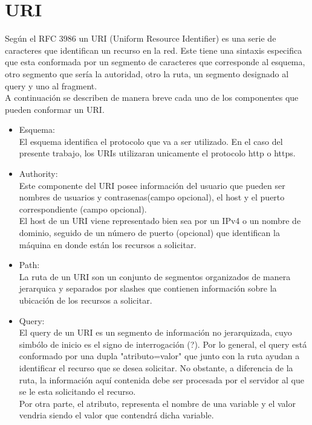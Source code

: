 \documentclass{article}
\begin{document}
\section{URI}

Seg\'un el RFC 3986 un URI (Uniform Resource Identifier) es una serie de caracteres que identifican un recurso en la red. Este tiene una sintaxis especifica que esta conformada por un segmento de caracteres que corresponde al esquema, otro segmento que ser\'ia la autoridad, otro la ruta, un segmento designado al query y uno al fragment.\\

A continuaci\'on se describen de manera breve cada uno de los componentes que pueden conformar un URI.

\begin{itemize}

\item Esquema:\\

El esquema identifica el protocolo que va a ser utilizado. En el caso del presente trabajo, los URIs utilizaran unicamente el protocolo http o https.\\


\item Authority:\\

Este componente del URI posee informaci\'on del usuario que pueden ser nombres de usuarios y contrasenas(campo opcional), el host y el puerto correspondiente (campo opcional).\\

El host de un URI viene representado bien sea por un IPv4 o un nombre de dominio, seguido de un n\'umero de puerto (opcional) que identifican la m\'aquina en donde est\'an los recursos a solicitar.\\
   
\item Path:\\
La ruta de un URI son un conjunto de segmentos organizados de manera jerarquica y separados por slashes que contienen informaci\'on sobre la ubicaci\'on de los recursos a solicitar.\\

\item Query:\\

El query de un URI es un segmento de informaci\'on no jerarquizada, cuyo simb\'olo de inicio es el signo de interrogaci\'on (?). Por lo general, el query est\'a conformado por una dupla "atributo=valor" que junto con la ruta ayudan a identificar el recurso que se desea solicitar. No obstante, a diferencia de la ruta, la informaci\'on aqu\'i contenida debe ser procesada por el servidor al que se le esta solicitando el recurso. \\
Por otra parte, el atributo, representa el nombre de una variable y el valor vendria siendo el valor que contendr\'a dicha variable.\\


\end{itemize}
\end{document}
